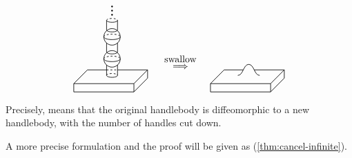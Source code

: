 \[ \begin{tikzpicture}[line width=.6]
    \tikzstyle{dp}=[dash pattern=on 2pt off 2pt]
    
    \draw (-.2,.2) -- (-.9,.2) -- (-1.4,-.3) -- (-1.4,-.6) -- (.8,-.6) -- (1.3,-.1) -- (1.3,.2) -- (.2,.2)
          (-1.4,-.3) -- (.8,-.3) -- (1.3,.2)
          (.8,-.3) -- (.8,-.6);
    \draw[dp] (-.2,.2) -- (.2,.2);

    \draw[dp] (-.2,0) arc (180 : 0 : .2 and .07);
    \draw (-.2,0) arc (180 : 360 : .2 and .07);
    \draw (-.2,0) -- (-.2,.38) (.2,0) -- (.2,.38);

    \draw (0,.6) circle (.3);
    \draw[dp] (-.3,.6) arc (180 : 0 : .3 and .1);
    \draw (-.3,.6) arc (180 : 360 : .3 and .1);

    \draw (-.2,.85) arc (180 : 360 : .2 and .07);
    \draw (-.2,.85) -- (-.2,1.18) (.2,.85) -- (.2,1.18);

    \draw (0,1.4) circle (.3);
    \draw[dp] (-.3,1.4) arc (180 : 0 : .3 and .1);
    \draw (-.3,1.4) arc (180 : 360 : .3 and .1);

    \draw (-.2,1.65) arc (180 : 360 : .2 and .07);
    \draw (-.2,1.65) -- (-.2,2) (.2,1.65) -- (.2,2);
    \draw (-.2,2) arc (180 : 360 : .2 and .07);
    \draw[dp] (-.2,2) arc (180 : 0 : .2 and .07);

    \fill (0,2.2) circle (.03);
    \fill (0,2.35) circle (.03);
    \fill (0,2.5) circle (.03);

    \node at (2.5,.3) {\text{$\Longrightarrow$}};
    \node at (2.5,.6) {\text{swallow}};
    
    \draw (4.8,.2) -- (4.1,.2) -- (3.6,-.3) -- (3.6,-.6) -- (5.8,-.6) -- (6.3,-.1) -- (6.3,.2) -- (5.2,.2)
          (3.6,-.3) -- (5.8,-.3) -- (6.3,.2)
          (5.8,-.3) -- (5.8,-.6);
    \draw (4.6,0) .. controls (4.8,0) and (4.8,.4) .. (5,.4)
                  .. controls (5.2,.4) and (5.2,0) .. (5.4,0);
\end{tikzpicture} \]

Precisely,  means that the original handlebody is
diffeomorphic to a new handlebody, with the number of handles cut down.

A more precise formulation and the proof 
will be given as (\ref{thm:cancel-infinite}).
